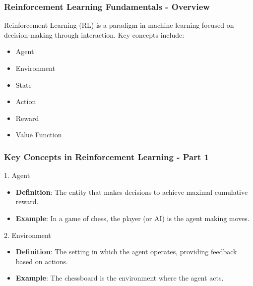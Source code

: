 \documentclass{beamer}
\begin{document}
\begin{frame}[fragile]
    \frametitle{Reinforcement Learning Fundamentals - Overview}
    Reinforcement Learning (RL) is a paradigm in machine learning focused on decision-making through interaction. Key concepts include:
    \begin{itemize}
        \item Agent
        \item Environment
        \item State
        \item Action
        \item Reward
        \item Value Function
    \end{itemize}
\end{frame}

\begin{frame}[fragile]
    \frametitle{Key Concepts in Reinforcement Learning - Part 1}
    \begin{block}{1. Agent}
        \begin{itemize}
            \item \textbf{Definition}: The entity that makes decisions to achieve maximal cumulative reward.
            \item \textbf{Example}: In a game of chess, the player (or AI) is the agent making moves.
        \end{itemize}
    \end{block}

    \begin{block}{2. Environment}
        \begin{itemize}
            \item \textbf{Definition}: The setting in which the agent operates, providing feedback based on actions.
            \item \textbf{Example}: The chessboard is the environment where the agent acts.
        \end{itemize}
    \end{block}
\end{frame}
\end{document}
